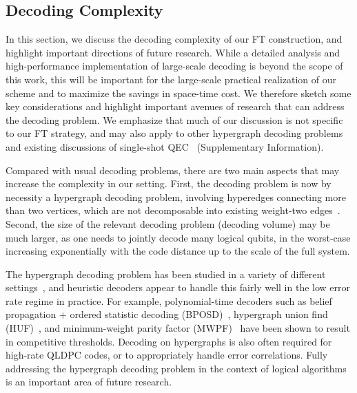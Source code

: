 \subsection{Decoding Complexity}
\label{methods:decoding}

In this section, we discuss the decoding complexity of our FT construction, and highlight important directions of future research.
%
While a detailed analysis and high-performance implementation of large-scale decoding is beyond the scope of this work, this will be important for the large-scale practical realization of our scheme and to maximize the savings in space-time cost.
%
We therefore sketch some key considerations and highlight important avenues of research that can address the decoding problem.
%
We emphasize that much of our discussion is not specific to our FT strategy, and may also apply to other hypergraph decoding problems and existing discussions of single-shot QEC~\cite{bombin2015single} (Supplementary Information).

Compared with usual decoding problems, there are two main aspects that may increase the complexity in our setting.
%
First, the decoding problem is now by necessity a hypergraph decoding problem, involving hyperedges connecting more than two vertices, which are not decomposable into existing weight-two edges~\cite{cain2024correlated}.
%
Second, the size of the relevant decoding problem (decoding volume) may be much larger, as one needs to jointly decode many logical qubits, in the worst-case increasing exponentially with the code distance up to the scale of the full system.

The hypergraph decoding problem has been studied in a variety of different settings~\cite{cain2024correlated,acharya2023suppressing,wootton2012high,fowler2013optimal,delfosse2022toward}, and heuristic decoders appear to handle this fairly well in the low error rate regime in practice.
%
For example, polynomial-time decoders such as belief propagation + ordered statistic decoding (BPOSD)~\cite{panteleev2019degenerate}, hypergraph union find (HUF)~\cite{delfosse2022toward,cain2024correlated}, and minimum-weight parity factor (MWPF)~\cite{wu2024hypergraph} have been shown to result in competitive thresholds.
%
Decoding on hypergraphs is also often required for high-rate QLDPC codes, or to appropriately handle error correlations.
%
Fully addressing the hypergraph decoding problem in the context of logical algorithms is an important area of future research.

